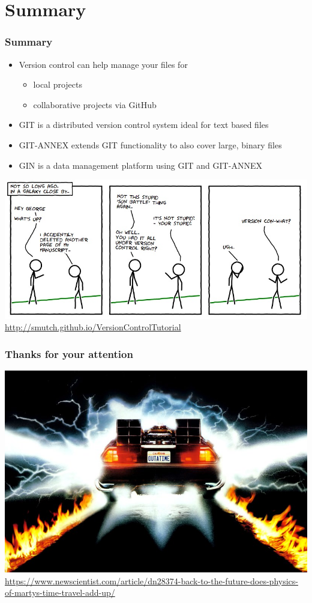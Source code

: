 \documentclass[
t, %
10pt, %
aspectratio=1610, %
ngerman,
english,
]{beamer}
\begin{document}
\section{Summary}

\begin{frame}
    \frametitle{Summary}
    \begin{itemize}
	\item Version control can help manage your files for
	\begin{itemize}
	    \item local projects
	    \item collaborative projects via GitHub
	\end{itemize}
	\item GIT is a distributed version control system ideal for text based files
	\item GIT-ANNEX extends GIT functionality to also cover large, binary files
	\item GIN is a data management platform using GIT and GIT-ANNEX
    \end{itemize}
    \centering
    \includegraphics[height=0.55\textheight]{graphics/vc-xkcd.jpg}
    \url{http://smutch.github.io/VersionControlTutorial}
\end{frame}


\begin{frame}
    \frametitle{Thanks for your attention}
    \centering
    \includegraphics[height=0.7\textheight]{graphics/dn28374-1_800.jpg}\\
    \url{https://www.newscientist.com/article/dn28374-back-to-the-future-does-physics-of-martys-time-travel-add-up/}
\end{frame}
\end{document}
